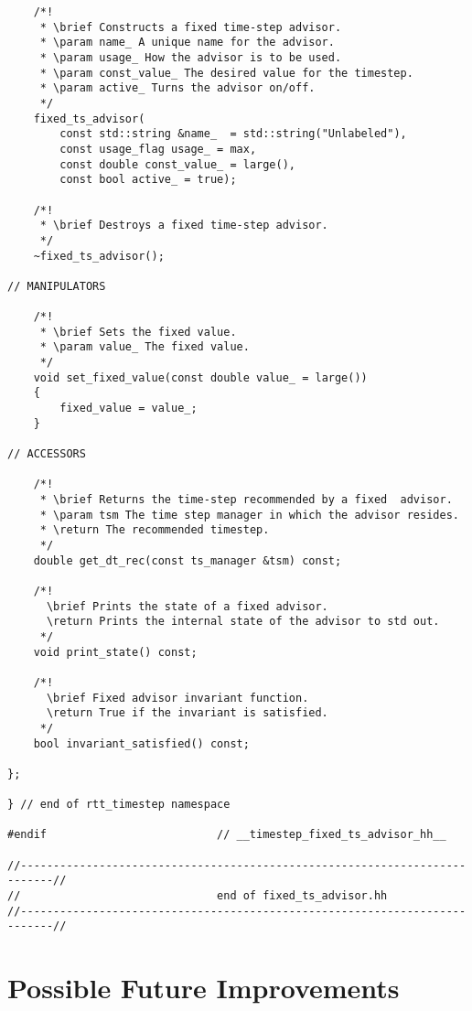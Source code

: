 \documentclass[11pt]{nmemo}
\begin{document}
\begin{verbatim}
    /*!
     * \brief Constructs a fixed time-step advisor.
     * \param name_ A unique name for the advisor.
     * \param usage_ How the advisor is to be used.
     * \param const_value_ The desired value for the timestep.
     * \param active_ Turns the advisor on/off.
     */
    fixed_ts_advisor( 
        const std::string &name_  = std::string("Unlabeled"),
        const usage_flag usage_ = max, 
        const double const_value_ = large(),
        const bool active_ = true);

    /*!
     * \brief Destroys a fixed time-step advisor.
     */
    ~fixed_ts_advisor();

// MANIPULATORS
    
    /*!
     * \brief Sets the fixed value.
     * \param value_ The fixed value.
     */
    void set_fixed_value(const double value_ = large())
    { 
        fixed_value = value_;
    }

// ACCESSORS

    /*!
     * \brief Returns the time-step recommended by a fixed  advisor.
     * \param tsm The time step manager in which the advisor resides.
     * \return The recommended timestep.
     */
    double get_dt_rec(const ts_manager &tsm) const;
    
    /*! 
      \brief Prints the state of a fixed advisor.
      \return Prints the internal state of the advisor to std out.
     */
    void print_state() const;
    
    /*! 
      \brief Fixed advisor invariant function.
      \return True if the invariant is satisfied.
     */
    bool invariant_satisfied() const;

};

} // end of rtt_timestep namespace

#endif                          // __timestep_fixed_ts_advisor_hh__

//---------------------------------------------------------------------------//
//                              end of fixed_ts_advisor.hh
//---------------------------------------------------------------------------//
\end{verbatim}


\section{Possible Future Improvements}
\end{document}
